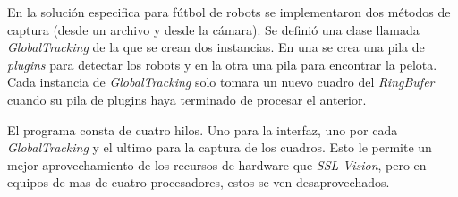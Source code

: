 En la solución especifica para fútbol de robots se implementaron dos métodos de
captura (desde un archivo y desde la cámara). Se definió una clase llamada
\emph{GlobalTracking} de la que se crean dos instancias. En una se crea una pila
de \emph{plugins} para detectar los robots y en la otra una pila para encontrar
la pelota. Cada instancia de \emph{GlobalTracking} solo tomara un nuevo cuadro
del \emph{RingBufer} cuando su pila de plugins haya terminado de procesar el
anterior.


El programa consta de cuatro hilos. Uno para la interfaz, uno por cada
\emph{GlobalTracking} y el ultimo para la captura de los cuadros. Esto le
permite un mejor aprovechamiento de los recursos de hardware que
\emph{SSL-Vision}, pero en equipos de mas de cuatro procesadores, estos se ven
desaprovechados.


